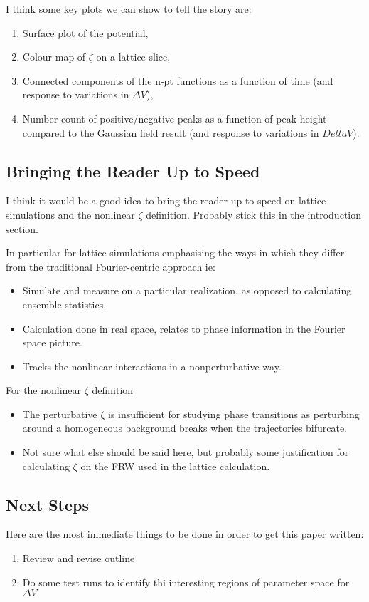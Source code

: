 \documentclass[11pt]{article}
\begin{document}
I think some key plots we can show to tell the story are:
\begin{enumerate}
  \item Surface plot of the potential,
  \item Colour map of $\zeta$ on a lattice slice, 
  \item Connected components of the n-pt functions as a function of time (and response to variations in $\Delta V$),
  \item Number count of positive/negative peaks as a function of peak height compared to the Gaussian field result (and response to variations in $Delta V$).
\end{enumerate}

\subsection{Bringing the Reader Up to Speed}
I think it would be a good idea to bring the reader up to speed on lattice simulations and the nonlinear $\zeta$ definition. Probably stick this in the introduction section.

In particular for lattice simulations emphasising the ways in which they differ from the traditional Fourier-centric approach ie:
\begin{itemize}
  \item Simulate and measure on a particular realization, as opposed to calculating ensemble statistics.
  \item Calculation done in real space, relates to phase information in the Fourier space picture.
  \item Tracks the nonlinear interactions in a nonperturbative way.
\end{itemize}

For the nonlinear $\zeta$ definition
\begin{itemize}
  \item The perturbative $\zeta$ is insufficient for studying phase transitions as perturbing around a homogeneous background breaks when the trajectories bifurcate.
  \item Not sure what else should be said here, but probably some justification for calculating $\zeta$ on the FRW used in the lattice calculation.
\end{itemize}

\subsection{Next Steps}
Here are the most immediate things to be done in order to get this paper written:
\begin{enumerate}
  \item Review and revise outline
  \item Do some test runs to identify thi interesting regions of parameter space for $\Delta V$
\end{enumerate}
\end{document}
